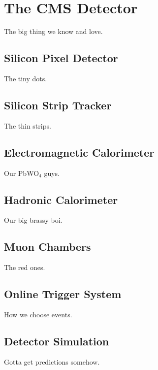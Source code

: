 \chapter{The CMS Detector}
\label{sec:cms}

The big thing we know and love.

\section{Silicon Pixel Detector}

The tiny dots.

\section{Silicon Strip Tracker}

The thin strips.

\section{Electromagnetic Calorimeter}

Our PbWO$_{4}$ guys.

\section{Hadronic Calorimeter}

Our big brassy boi.

\section{Muon Chambers}

The red ones.

\section{Online Trigger System}

How we choose events.

\section{Detector Simulation}

Gotta get predictions somehow.



